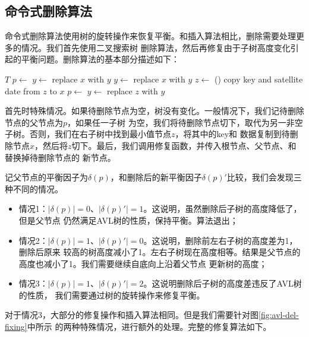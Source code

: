 \documentclass[UTF8]{article}
\begin{document}
\subsection{命令式删除算法}

命令式删除算法使用树的旋转操作来恢复平衡。和插入算法相比，删除需要处理更多的情况。我们首先使用二叉搜索树
删除算法，然后再修复由于子树高度变化引起的平衡问题。删除算法的基本部分描述如下：

\begin{algorithmic}[1]
    \State \Return $T$
  \EndIf
  \State $p \gets$ 
    \State $y \gets $ 
    \State replace $x$ with $y$
    \State $y \gets $ 
    \State replace $x$ with $y$
  \Else
    \State $z \gets$ ()
    \State copy key and satellite date from $z$ to $x$
    \State $p \gets$ 
    \State $y \gets$ 
    \State replace $z$ with $y$
  \EndIf
  \State \Return {}
\EndFunction
\end{algorithmic}

首先时特殊情况。如果待删除节点为空，树没有变化。一般情况下，我们记待删除节点的父节点为$p$，如果任一子树
为空，我们将待删除节点切下，取代为另一非空子树。否则，我们在右子树中找到最小值节点$z$，将其中的key和
数据复制到待删除节点$x$，然后将$z$切下。最后，我们调用修复函数，并传入根节点、父节点、和替换掉待删除节点的
新节点。

记父节点的平衡因子为$\delta(p)$，和删除后的新平衡因子$\delta(p)'$比较，我们会发现三种不同的情况。

\begin{itemize}
\item 情况1：$|\delta(p)| = 0$、$|\delta(p)'| = 1$。这说明，虽然删除后子树的高度降低了，但是父节点
仍然满足AVL树的性质，保持平衡。算法退出；
\item 情况2：$|\delta(p)| = 1$、$|\delta(p)'| = 0$。这说明，删除前左右子树的高度差为1，删除后原来
较高的树高度减小了1。左右子树现在高度相等。结果是父节点的高度也减小了1。我们需要继续自底向上沿着父节点
更新树的高度；
\item 情况3：$|\delta(p)| = 1$、$|\delta(p)'| = 2$。这说明删除后子树的高度差违反了AVL树的性质，
我们需要通过树的旋转操作来修复平衡。
\end{itemize}

对于情况3，大部分的修复操作和插入算法相同。但是我们需要针对图\ref{fig:avl-del-fixing}中所示
的两种特殊情况，进行额外的处理。完整的修复算法如下。
\end{document}
